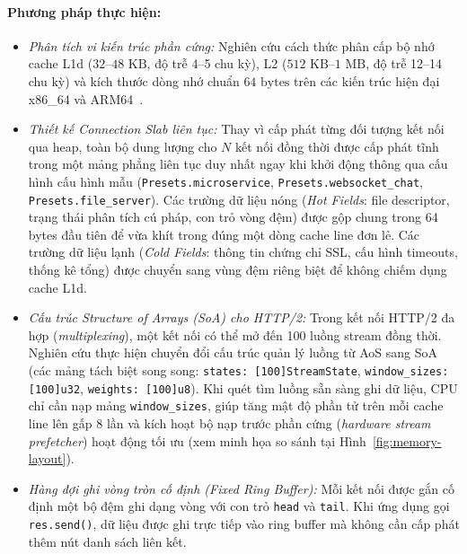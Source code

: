 \documentclass[letterpaper]{article}
\begin{document}
\paragraph{Phương pháp thực hiện:}
\begin{itemize}
    \item \textit{Phân tích vi kiến trúc phần cứng:} Nghiên cứu cách thức phân cấp bộ nhớ cache L1d ($32\text{--}48\text{ KB}$, độ trễ 4--5 chu kỳ), L2 ($512\text{ KB}\text{--}1\text{ MB}$, độ trễ 12--14 chu kỳ) và kích thước dòng nhớ chuẩn $64\text{ bytes}$ trên các kiến trúc hiện đại x86\_64 và ARM64~\cite{drepper_memory}.
    \item \textit{Thiết kế Connection Slab liên tục:} Thay vì cấp phát từng đối tượng kết nối qua heap, toàn bộ dung lượng cho $N$ kết nối đồng thời được cấp phát tĩnh trong một mảng phẳng liên tục duy nhất ngay khi khởi động thông qua cấu hình cấu hình mẫu (\texttt{Presets.microservice}, \texttt{Presets.websocket\_chat}, \texttt{Presets.file\_server}). Các trường dữ liệu nóng (\emph{Hot Fields}: file descriptor, trạng thái phân tích cú pháp, con trỏ vòng đệm) được gộp chung trong 64 bytes đầu tiên để vừa khít trong đúng một dòng cache line đơn lẻ. Các trường dữ liệu lạnh (\emph{Cold Fields}: thông tin chứng chỉ SSL, cấu hình timeouts, thống kê tổng) được chuyển sang vùng đệm riêng biệt để không chiếm dụng cache L1d.
    \item \textit{Cấu trúc Structure of Arrays (SoA) cho HTTP/2:} Trong kết nối HTTP/2 đa hợp (\emph{multiplexing}), một kết nối có thể mở đến 100 luồng stream đồng thời. Nghiên cứu thực hiện chuyển đổi cấu trúc quản lý luồng từ AoS sang SoA (các mảng tách biệt song song: \texttt{states: [100]StreamState}, \texttt{window\_sizes: [100]u32}, \texttt{weights: [100]u8}). Khi quét tìm luồng sẵn sàng ghi dữ liệu, CPU chỉ cần nạp mảng \texttt{window\_sizes}, giúp tăng mật độ phần tử trên mỗi cache line lên gấp 8 lần và kích hoạt bộ nạp trước phần cứng (\emph{hardware stream prefetcher}) hoạt động tối ưu (xem minh họa so sánh tại Hình~\ref{fig:memory-layout}).
    \item \textit{Hàng đợi ghi vòng tròn cố định (\emph{Fixed Ring Buffer}):} Mỗi kết nối được gắn cố định một bộ đệm ghi dạng vòng với con trỏ \texttt{head} và \texttt{tail}. Khi ứng dụng gọi \texttt{res.send()}, dữ liệu được ghi trực tiếp vào ring buffer mà không cần cấp phát thêm nút danh sách liên kết.
\end{itemize}
\end{document}
